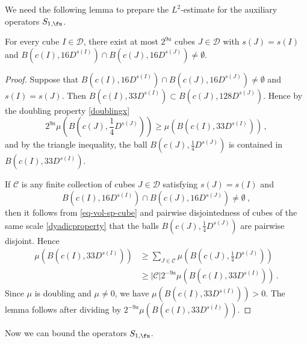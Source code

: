 We need the following lemma to prepare the $L^2$-estimate for the auxiliary operators $S_{1, \fu}$.

\begin{lemma}
    \label{boundary-overlap}
    \leanok
    For every cube $I \in \mathcal{D}$, there exist at most $2^{9a}$ cubes $J \in \mathcal{D}$ with $s(J) = s(I)$ and $B(c(I), 16D^{s(I)}) \cap B(c(J), 16 D^{s(J)}) \ne \emptyset$.
\end{lemma}

\begin{proof}
    \leanok
    Suppose that $B(c(I), 16 D^{s(I)}) \cap B(c(J), 16 D^{s(J)}) \ne \emptyset$ and $s(I) = s(J)$. Then $B(c(I), 33 D^{s(I)}) \subset B(c(J), 128 D^{s(J)})$. Hence by the doubling property \eqref{doublingx}
    $$
        2^{9a}\mu(B(c(J), \frac{1}{4}D^{s(J)})) \ge \mu(B(c(I), 33 D^{s(I)}))\,,
    $$
    and by the triangle inequality, the ball $B(c(J), \frac{1}{4}D^{s(J)})$ is contained in $B(c(I), 33 D^{s(I)})$.

    If $\mathcal{C}$ is any finite collection of cubes $J \in \mathcal{D}$ satisfying $s(J) = s(I)$ and
    \begin{equation*}
        B(c(I), 16 D^{s(I)}) \cap B(c(J), 16 D^{s(J)}) \ne\emptyset\ ,
    \end{equation*} then it follows from \eqref{eq-vol-sp-cube} and pairwise disjointedness of cubes of the same scale \eqref{dyadicproperty} that the balls $B(c(J), \frac{1}{4} D^{s(J)})$ are pairwise disjoint. Hence
    \begin{align*}
        \mu(B(c(I), 33 D^{s(I)})) &\ge \sum_{J \in \mathcal{C}} \mu(B(c(J), \frac{1}{4}D^{s(J)}))\\
        &\ge |\mathcal{C}| 2^{-9a} \mu(B(c(I), 33 D^{s(I)}))\,.
    \end{align*}
    Since $\mu$ is doubling and $\mu \ne 0$, we have $\mu(B(c(I), 33D^{s(I)})) > 0$. The lemma follows after dividing by $2^{-9a}\mu(B(c(I), 33D^{s(I)}))$.
\end{proof}

Now we can bound the operators $S_{1, \fu}$.


